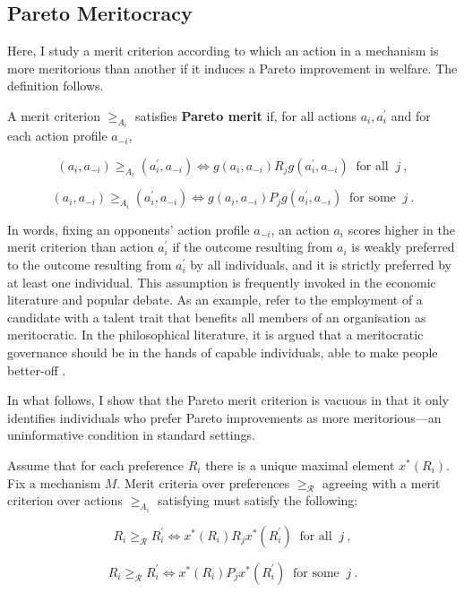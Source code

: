 \subsection{Pareto Meritocracy}\label{subsec:pareto}

Here, I study a merit criterion according to which an action in a mechanism is more meritorious than another if it induces a Pareto improvement in welfare. The definition follows.

\begin{definition}\label{def:pareto}
	A merit criterion \( \geq_{A_i} \) satisfies \textbf{Pareto merit} if, for all actions \( a_i, a_i^{\prime} \) and for each action profile \( a_{-i} \),

	\[ ( a_i, a_{-i} ) \geq_{A_i} ( a^{\prime}_i, a_{-i} ) \iff g ( a_i, a_{-i} ) R_j  g ( a^{\prime}_i, a_{-i} ) \: \text{ for all } \: j \: , \]

	\[ ( a_i, a_{-i} ) \geq_{A_i} ( a^{\prime}_i, a_{-i} ) \iff g ( a_i, a_{-i} ) P_j  g ( a^{\prime}_i, a_{-i} ) \: \text{ for some } \: j \: .\]
\end{definition}

In words, fixing an opponents' action profile \( a_{-i} \), an action \( a_i \) scores higher in the merit criterion than action \( a^{\prime}_{i} \) if the outcome resulting from \( a_i \) is weakly preferred to the outcome resulting from \( a^{\prime}_{i} \) by all individuals, and it is strictly preferred by at least one individual. This assumption is frequently invoked in the economic literature and popular debate. As an example, \cite{moissonCooptationMeritocracyVs2024} refer to the employment of a candidate with a talent trait that benefits all members of an organisation as meritocratic. In the philosophical literature, it is argued that a meritocratic governance should be in the hands of capable individuals, able to make people better-off \citep{sep-meritocracy}.

In what follows, I show that the Pareto merit criterion is vacuous in that it only identifies individuals who prefer Pareto improvements as more meritorious—an uninformative condition in standard settings.

\begin{prop}\label{prop:pareto}
	Assume that for each preference \( R_i \) there is a unique maximal element \( x^{*} (R_i) \). Fix a mechanism \( M \). Merit criteria over preferences \( \geq_{\mathcal{R}} \) agreeing with a merit criterion over actions \( \geq_{A_i} \) satisfying  must satisfy the following:

	\[
		R_i \geq_{\mathcal{R}} R_i^{\prime} \iff x^{*} (R_i) R_j x^{*} (R^{\prime}_i)  \: \text{ for all } \: j \: ,
	\]

	\[
		R_i \geq_{\mathcal{R}} R_i^{\prime} \iff x^{*} (R_i) P_j x^{*} (R^{\prime}_i)  \: \text{ for some } \: j \: .
	\]
\end{prop}

